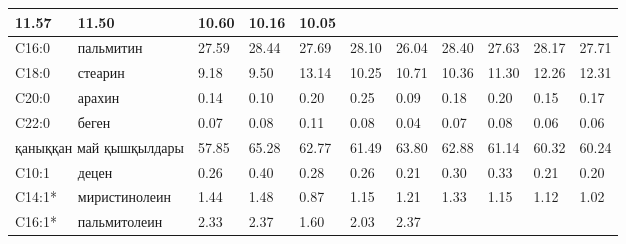 \begin{table}[]
{\begin{tabular}{|ll|lll|lll|lll|}
    \multicolumn{1}{l|}{11.57} &
    11.50 &
    \multicolumn{1}{l|}{10.60} &
    \multicolumn{1}{l|}{10.16} &
    10.05 \\ \hline
  \multicolumn{1}{|l|}{C16:0} &
    пальмитин &
    \multicolumn{1}{l|}{27.59} &
    \multicolumn{1}{l|}{28.44} &
    27.69 &
    \multicolumn{1}{l|}{28.10} &
    \multicolumn{1}{l|}{26.04} &
    28.40 &
    \multicolumn{1}{l|}{27.63} &
    \multicolumn{1}{l|}{28.17} &
    27.71 \\ \hline
  \multicolumn{1}{|l|}{C18:0} &
    стеарин &
    \multicolumn{1}{l|}{9.18} &
    \multicolumn{1}{l|}{9.50} &
    13.14 &
    \multicolumn{1}{l|}{10.25} &
    \multicolumn{1}{l|}{10.71} &
    10.36 &
    \multicolumn{1}{l|}{11.30} &
    \multicolumn{1}{l|}{12.26} &
    12.31 \\ \hline
  \multicolumn{1}{|l|}{C20:0} &
    арахин &
    \multicolumn{1}{l|}{0.14} &
    \multicolumn{1}{l|}{0.10} &
    0.20 &
    \multicolumn{1}{l|}{0.25} &
    \multicolumn{1}{l|}{0.09} &
    0.18 &
    \multicolumn{1}{l|}{0.20} &
    \multicolumn{1}{l|}{0.15} &
    0.17 \\ \hline
  \multicolumn{1}{|l|}{C22:0} &
    беген &
    \multicolumn{1}{l|}{0.07} &
    \multicolumn{1}{l|}{0.08} &
    0.11 &
    \multicolumn{1}{l|}{0.08} &
    \multicolumn{1}{l|}{0.04} &
    0.07 &
    \multicolumn{1}{l|}{0.08} &
    \multicolumn{1}{l|}{0.06} &
    0.06 \\ \hline
  \multicolumn{2}{|l|}{қаныққан май қышқылдары} &
    \multicolumn{1}{l|}{57.85} &
    \multicolumn{1}{l|}{65.28} &
    62.77 &
    \multicolumn{1}{l|}{61.49} &
    \multicolumn{1}{l|}{63.80} &
    62.88 &
    \multicolumn{1}{l|}{61.14} &
    \multicolumn{1}{l|}{60.32} &
    60.24 \\ \hline
  \multicolumn{1}{|l|}{C10:1} &
    децен &
    \multicolumn{1}{l|}{0.26} &
    \multicolumn{1}{l|}{0.40} &
    0.28 &
    \multicolumn{1}{l|}{0.26} &
    \multicolumn{1}{l|}{0.21} &
    0.30 &
    \multicolumn{1}{l|}{0.33} &
    \multicolumn{1}{l|}{0.21} &
    0.20 \\ \hline
  \multicolumn{1}{|l|}{C14:1*} &
    миристинолеин &
    \multicolumn{1}{l|}{1.44} &
    \multicolumn{1}{l|}{1.48} &
    0.87 &
    \multicolumn{1}{l|}{1.15} &
    \multicolumn{1}{l|}{1.21} &
    1.33 &
    \multicolumn{1}{l|}{1.15} &
    \multicolumn{1}{l|}{1.12} &
    1.02 \\ \hline
  \multicolumn{1}{|l|}{C16:1*} &
    пальмитолеин &
    \multicolumn{1}{l|}{2.33} &
    \multicolumn{1}{l|}{2.37} &
    1.60 &
    \multicolumn{1}{l|}{2.03} &
    \multicolumn{1}{l|}{2.37} &

\end{tabular}}
\end{table}
